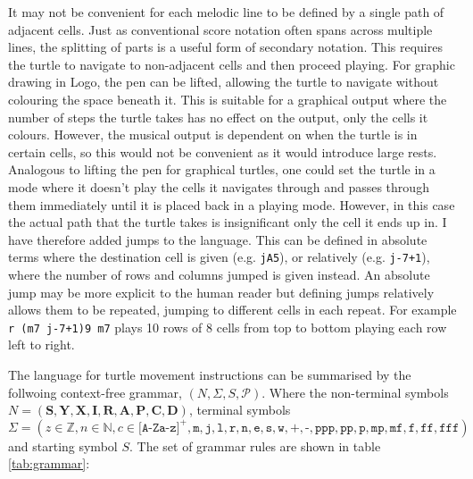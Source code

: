 \documentclass{article}
\begin{document}
It may not be convenient for each melodic line to be defined by a single path of adjacent cells. Just as conventional score notation often spans across multiple lines, the splitting of parts is a useful form of secondary notation. This requires the turtle to navigate to non-adjacent cells and then proceed playing. For graphic drawing in Logo, the pen can be lifted, allowing the turtle to navigate without colouring the space beneath it. This is suitable for a graphical output where the number of steps the turtle takes has no effect on the output, only the cells it colours. However, the musical output is dependent on when the turtle is in certain cells, so this would not be convenient as it would introduce large rests. Analogous to lifting the pen for graphical turtles, one could set the turtle in a mode where it doesn't play the cells it navigates through and passes through them immediately until it is placed back in a playing mode. However, in this case the actual path that the turtle takes is insignificant only the cell it ends up in. I have therefore added jumps to the language. This can be defined in absolute terms where the destination cell is given (e.g. \texttt{jA5}), or relatively (e.g. \texttt{j-7+1}), where the number of rows and columns jumped is given instead. An absolute jump may be more explicit to the human reader but defining jumps relatively allows them to be repeated, jumping to different cells in each repeat. For example \texttt{r (m7 j-7+1)9 m7} plays 10 rows of 8 cells from top to bottom playing each row left to right.

The language for turtle movement instructions can be summarised by the follwoing context-free grammar, $(N,\Sigma,S,\mathcal{P})$. Where the non-terminal symbols $N=(\mathbf{S}, \mathbf{Y}, \mathbf{X}, \mathbf{I}, \mathbf{R}, \mathbf{A}, \mathbf{P}, \mathbf{C}, \mathbf{D})$, terminal symbols $\Sigma=(z{\in}\mathbb{Z}, n{\in}\mathbb{N}, c{\in}\texttt{[A-Za-z]}^{+}, \texttt{m}, \texttt{j}, \texttt{l}, \texttt{r}, \texttt{n}, \texttt{e}, \texttt{s}, \texttt{w}, \texttt{+}, \texttt{-}, \texttt{ppp}, \texttt{pp}, \texttt{p}, \texttt{mp}, \texttt{mf}, \texttt{f}, \texttt{ff}, \texttt{fff})$ and starting symbol $S$. The set of grammar rules are shown in table \ref{tab:grammar}:
\end{document}
